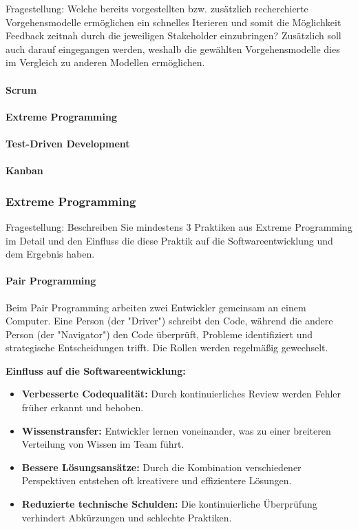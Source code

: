 Fragestellung: Welche bereits vorgestellten bzw. zusätzlich recherchierte Vorgehensmodelle ermöglichen ein
schnelles Iterieren und somit die Möglichkeit Feedback zeitnah durch die jeweiligen Stakeholder
einzubringen? Zusätzlich soll auch darauf eingegangen werden, weshalb die gewählten
Vorgehensmodelle dies im Vergleich zu anderen Modellen ermöglichen.
\\

\paragraph{Scrum}



\paragraph{Extreme Programming}


\paragraph{Test-Driven Development}


\paragraph{Kanban}



\subsubsection{Extreme Programming}

Fragestellung: Beschreiben Sie mindestens 3 Praktiken aus Extreme Programming im Detail und den Einfluss
die diese Praktik auf die Softwareentwicklung und dem Ergebnis haben.

\paragraph{Pair Programming}
Beim Pair Programming arbeiten zwei Entwickler gemeinsam an einem Computer. Eine Person (der "Driver") schreibt den Code, während die andere Person (der "Navigator") den Code überprüft, Probleme identifiziert und strategische Entscheidungen trifft. Die Rollen werden regelmäßig gewechselt.

\textbf{Einfluss auf die Softwareentwicklung:}
\begin{itemize}
    \item \textbf{Verbesserte Codequalität:} Durch kontinuierliches Review werden Fehler früher erkannt und behoben.
    \item \textbf{Wissenstransfer:} Entwickler lernen voneinander, was zu einer breiteren Verteilung von Wissen im Team führt.
    \item \textbf{Bessere Lösungsansätze:} Durch die Kombination verschiedener Perspektiven entstehen oft kreativere und effizientere Lösungen.
    \item \textbf{Reduzierte technische Schulden:} Die kontinuierliche Überprüfung verhindert Abkürzungen und schlechte Praktiken.
\end{itemize}

